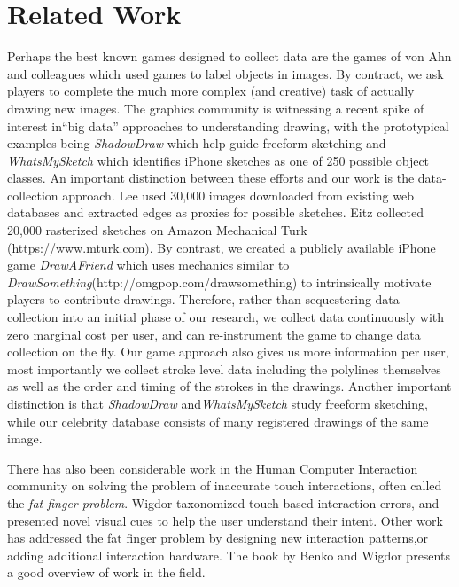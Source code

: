 \section{Related Work}

Perhaps the best known games designed to collect data are the games of von Ahn and colleagues  which used games to label objects in images. By contract, we ask players to complete the much more complex (and creative) task of actually drawing new images. The graphics community is witnessing a recent spike of interest in``big data'' approaches to understanding drawing, with the prototypical examples being \emph{ShadowDraw} \cite{Lee:2011} which help guide freeform sketching and \emph{WhatsMySketch}\cite{Eitz:2012:HSO} which identifies iPhone sketches as one of 250 possible object classes. An important distinction between these efforts and our work is the data-collection approach. Lee \etal used 30,000 images downloaded from existing web databases and extracted edges as proxies for possible sketches. Eitz \etal collected 20,000 rasterized sketches on Amazon Mechanical Turk (https://www.mturk.com). By contrast, we created a publicly available iPhone game \emph{DrawAFriend} which uses mechanics similar to \emph{DrawSomething}(http://omgpop.com/drawsomething) to intrinsically motivate players to contribute drawings. Therefore, rather than sequestering data collection into an initial phase of our research, we collect data continuously with zero marginal cost per user, and can re-instrument the game to change data collection on the fly. Our game approach also gives us more information per user, most importantly we collect stroke level data including the polylines themselves as well as the order and timing of the strokes in the drawings. Another important distinction is that \emph{ShadowDraw} and\emph{WhatsMySketch} study freeform sketching, while our celebrity database consists of many registered drawings of the same image.

There has also been considerable work in the Human Computer Interaction community on solving the problem of inaccurate touch interactions, often called the \emph{fat finger problem}. Wigdor\etal {} taxonomized touch-based interaction errors, and presented novel visual cues to help the user understand their intent. Other work has addressed the fat finger problem by designing new interaction patterns\cite{Albinsson:2003:HPT,Benko:2006:PST,Forlines06hybridpointing,Vogel07shift:a},or adding additional interaction hardware\cite{Scott:2010:RTE,Wigdor:2006:UTI,Wigdor:2007:LTS}. The book by Benko and Wigdor  presents a good overview of work in the field.

